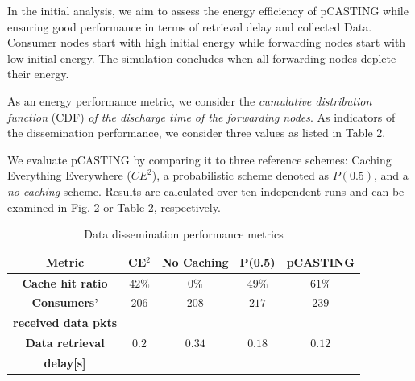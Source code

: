 \documentclass[conference]{IEEEtran}
\begin{document}
In the initial analysis, we aim to assess the energy efficiency of pCASTING while ensuring good performance in terms of retrieval delay and 
collected Data. Consumer nodes start with high initial energy while forwarding nodes start with low initial energy. The simulation concludes 
when all forwarding nodes deplete their energy.

As an energy performance metric, we consider the \textit{cumulative distribution function} (CDF) \textit{of the discharge time of the forwarding nodes}.
As indicators of the dissemination performance, we consider three values as listed in Table 2.

We evaluate pCASTING by comparing it to three reference schemes:
Caching Everything Everywhere ($CE^2$),
a probabilistic scheme denoted as $P(0.5)$,
and a \textit{no caching} scheme.
Results are calculated over ten independent runs and can be examined in Fig. 2 or Table 2, respectively.


\begin{table}[htbp]
    \caption{Data dissemination performance metrics}
    \begin{center}
    \begin{tabular}{c|c|c|c|c|}
    \textbf{Metric} & \textbf{CE$^\text{2}$}& \textbf{No Caching} & \textbf{P(0.5)} & \textbf{pCASTING} \\
    \hline
    \textbf{Cache hit ratio} & $42 \%$ & $0 \%$ & $49 \%$ & $61 \%$ \\
    \hline
    \textbf{Consumers'} & $206$ & $208$ & $217$ & $239$ \\
    \textbf{received data pkts} & & & & \\
    \hline
    \textbf{Data retrieval} & $0.2$ & $0.34$ & $0.18$ & $0.12$ \\
    \textbf{delay[s]} & & & & \\
    \hline
    \end{tabular}
    \label{tab2}
    \end{center}
\end{table}


\end{document}
